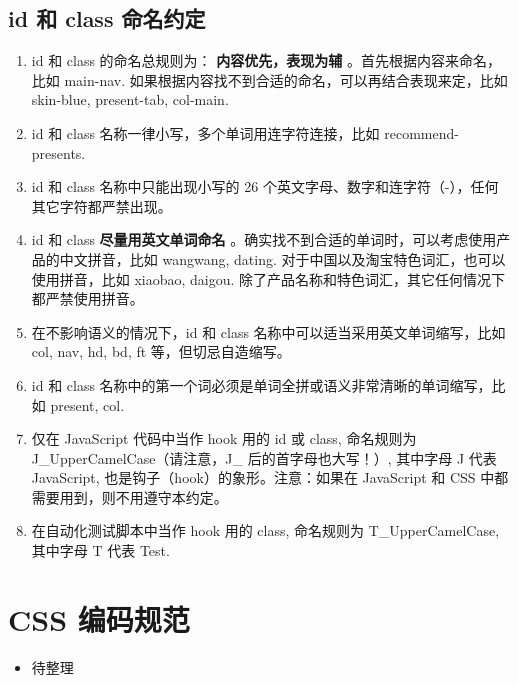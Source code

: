 \documentclass[letterpaper,10pt,english]{sphinxmanual}
\begin{document}
\subsection{id 和 class 命名约定}
\label{styleguide/common-conventions:id-class}\begin{enumerate}
\item {}
id 和 class 的命名总规则为： \textbf{内容优先，表现为辅} 。首先根据内容来命名，比如 main-nav. 如果根据内容找不到合适的命名，可以再结合表现来定，比如 skin-blue, present-tab, col-main.

\item {}
id 和 class 名称一律小写，多个单词用连字符连接，比如 recommend-presents.

\item {}
id 和 class 名称中只能出现小写的 26 个英文字母、数字和连字符（-），任何其它字符都严禁出现。

\item {}
id 和 class \textbf{尽量用英文单词命名} 。确实找不到合适的单词时，可以考虑使用产品的中文拼音，比如 wangwang, dating. 对于中国以及淘宝特色词汇，也可以使用拼音，比如 xiaobao, daigou. 除了产品名称和特色词汇，其它任何情况下都严禁使用拼音。

\item {}
在不影响语义的情况下，id 和 class 名称中可以适当采用英文单词缩写，比如 col, nav, hd, bd, ft 等，但切忌自造缩写。

\item {}
id 和 class 名称中的第一个词必须是单词全拼或语义非常清晰的单词缩写，比如 present, col.

\item {}
仅在 JavaScript 代码中当作 hook 用的 id 或 class, 命名规则为 J\_UpperCamelCase（请注意，J\_ 后的首字母也大写！）, 其中字母 J 代表 JavaScript, 也是钩子（hook）的象形。注意：如果在 JavaScript 和 CSS 中都需要用到，则不用遵守本约定。

\item {}
在自动化测试脚本中当作 hook 用的 class, 命名规则为 T\_UpperCamelCase, 其中字母 T 代表 Test.

\end{enumerate}


\section{CSS 编码规范}
\label{styleguide/css-coding-style::doc}\label{styleguide/css-coding-style:styleguide-csscodingstyle}\label{styleguide/css-coding-style:css}\begin{itemize}
\item {}
待整理

\end{itemize}
\end{document}
